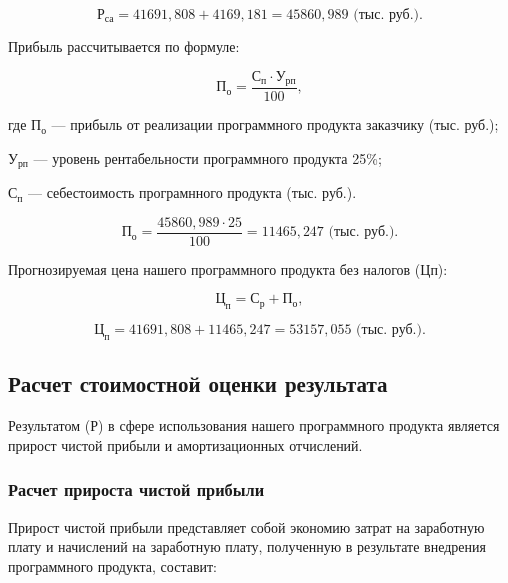 \begin{displaymath}
  \text{Р}_{\text{са}} = 41691,808+4169,181 = 45860,989 \text{ (тыс. руб.)}.
\end{displaymath}

Прибыль рассчитывается по формуле:

\begin{displaymath}
  \text{П}_{\text{о}} = \frac{\text{С}_{\text{п}} \cdot \text{У}_{\text{рп}}}{100},
\end{displaymath}

где \(\text{П}_{\text{о}}\) --- прибыль от реализации программного продукта заказчику (тыс. руб.);

\(\text{У}_{\text{рп}}\) --- уровень рентабельности программного продукта 25\%; 

\(\text{С}_{\text{п}}\) --- себестоимость програмнного продукта (тыс. руб.).

\begin{displaymath}
  \text{П}_{\text{о}} = \frac{45860,989 \cdot 25}{100} = 11465,247 \text{ (тыс. руб.)}.
\end{displaymath}

Прогнозируемая цена нашего программного продукта без налогов (Цп): 

\begin{displaymath}
  \text{Ц}_{\text{п}} = \text{С}_{\text{р}} + \text{П}_{\text{о}},
\end{displaymath}

\begin{displaymath}
  \text{Ц}_{\text{п}} = 41691,808+11465,247 = 53157,055 \text{ (тыс. руб.)}.
\end{displaymath}

\subsection{Расчет стоимостной оценки результата}

Результатом (Р) в сфере использования нашего программного продукта является прирост чистой прибыли и амортизационных отчислений.

\subsubsection{Расчет прироста чистой прибыли}

Прирост чистой прибыли представляет собой экономию затрат на заработную плату и начислений на заработную плату, полученную в результате внедрения программного продукта, составит:

